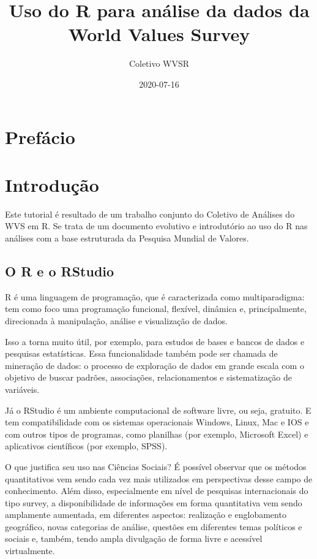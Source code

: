 \documentclass[
  brazil,
]{book}
\title{Uso do R para análise da dados da World Values Survey}
\author{Coletivo WVSR}
\date{2020-07-16}
\begin{document}
\maketitle

{
\setcounter{tocdepth}{1}
\tableofcontents
}
\hypertarget{prefuxe1cio}{%
\chapter{Prefácio}\label{prefuxe1cio}}

\hypertarget{intro}{%
\chapter{Introdução}\label{intro}}

Este tutorial é resultado de um trabalho conjunto do Coletivo de Análises do WVS em R. Se trata de um documento evolutivo e introdutório ao uso do R nas análises com a base estruturada da Pesquisa Mundial de Valores.

\hypertarget{o-r-e-o-rstudio}{%
\section{O R e o RStudio}\label{o-r-e-o-rstudio}}

R é uma linguagem de programação, que é caracterizada como multiparadigma: tem como foco uma programação funcional, flexível, dinâmica e, principalmente, direcionada à manipulação, análise e visualização de dados.

Isso a torna muito útil, por exemplo, para estudos de bases e bancos de dados e pesquisas estatísticas. Essa funcionalidade também pode ser chamada de mineração de dados: o processo de exploração de dados em grande escala com o objetivo de buscar padrões, associações, relacionamentos e sistematização de variáveis.

Já o RStudio é um ambiente computacional de software livre, ou seja, gratuito. E tem compatibilidade com os sistemas operacionais Windows, Linux, Mac e IOS e com outros tipos de programas, como planilhas (por exemplo, Microsoft Excel) e aplicativos científicos (por exemplo, SPSS).

O que justifica seu uso nas Ciências Sociais? É possível observar que os métodos quantitativos vem sendo cada vez mais utilizados em perspectivas desse campo de conhecimento. Além disso, especialmente em nível de pesquisas internacionais do tipo survey, a disponibilidade de informações em forma quantitativa vem sendo amplamente aumentada, em diferentes aspectos: realização e englobamento geográfico, novas categorias de análise, questões em diferentes temas políticos e sociais e, também, tendo ampla divulgação de forma livre e acessível virtualmente.
\end{document}
